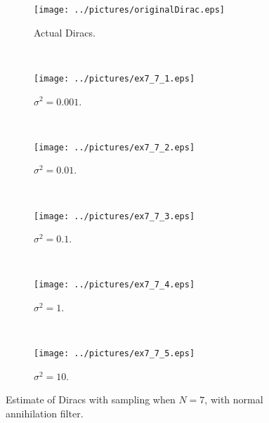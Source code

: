 \documentclass[11pt,a4paper]{report}
\begin{document}
\begin{figure}[H]
    \captionsetup[subfigure]{position=b}
    \centering
    \begin{subfigure}{0.49\textwidth}
        \texttt{[image: ../pictures/originalDirac.eps]}
        \caption{Actual Diracs.}
        \label{fig:ex7_7_0}
    \end{subfigure}
    ~
    \begin{subfigure}{0.49\textwidth}
        \texttt{[image: ../pictures/ex7\_7\_1.eps]}
        \caption{$\sigma^2 = 0.001$.}
        \label{fig:ex7_7_1}
    \end{subfigure}
    \\
    \begin{subfigure}{0.49\textwidth}
        \texttt{[image: ../pictures/ex7\_7\_2.eps]}
        \caption{$\sigma^2 = 0.01$.}
        \label{fig:ex7_7_2}
    \end{subfigure}
    ~
    \begin{subfigure}{0.49\textwidth}
        \texttt{[image: ../pictures/ex7\_7\_3.eps]}
        \caption{$\sigma^2 = 0.1$.}
        \label{fig:ex7_7_3}
    \end{subfigure}
    \\
    \begin{subfigure}{0.49\textwidth}
        \texttt{[image: ../pictures/ex7\_7\_4.eps]}
        \caption{$\sigma^2 = 1$.}
        \label{fig:ex7_7_4}
    \end{subfigure}
    ~
    \begin{subfigure}{0.49\textwidth}
        \texttt{[image: ../pictures/ex7\_7\_5.eps]}
        \caption{$\sigma^2 = 10$.}
        \label{fig:ex7_7_5}
    \end{subfigure}

    \caption{Estimate of Diracs with sampling when $N = 7$, with normal annihilation filter.}
    \label{fig:ex7_7}
\end{figure}
\end{document}
